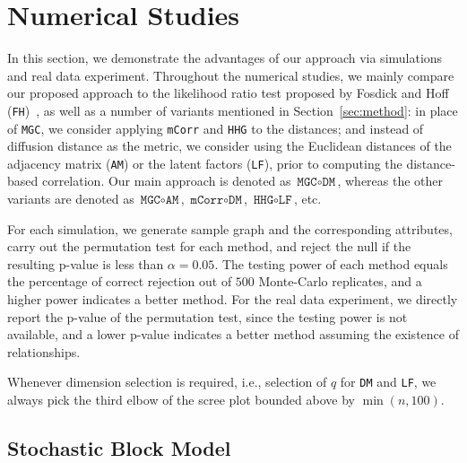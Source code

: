 \documentclass[11pt]{article}
\theoremstyle{definition}
\begin{document}
\section{Numerical Studies}
\label{sec:simulation}

In this section, we demonstrate the advantages of our approach via simulations and real data experiment. Throughout the numerical studies, we mainly compare our proposed approach to the likelihood ratio test proposed by Fosdick and Hoff (\texttt{FH})~\cite{fosdick2015testing}, as well as a number of variants mentioned in Section~\ref{sec:method}: in place of \texttt{MGC}, we consider applying \texttt{mCorr} and \texttt{HHG} to the distances; and instead of diffusion distance as the metric, we consider using the Euclidean distances of the adjacency matrix (\texttt{AM}) or the latent factors (\texttt{LF}), prior to computing the distance-based correlation. Our main approach is denoted as $\texttt{MGC} \circ \texttt{DM}$, whereas the other variants are denoted as $\texttt{MGC} \circ \texttt{AM}$, $\texttt{mCorr} \circ \texttt{DM}$, $\texttt{HHG} \circ \texttt{LF}$, etc. 

For each simulation, we generate sample graph and the corresponding attributes, carry out the permutation test for each method, and reject the null if the resulting p-value is less than $\alpha = 0.05$. The testing power of each method equals the percentage of correct rejection out of $500$ Monte-Carlo replicates, and a higher power indicates a better method. For the real data experiment, we directly report the p-value of the permutation test, since the testing power is not available, and a lower p-value indicates a better method assuming the existence of relationships. 

Whenever dimension selection is required, i.e., selection of $q$ for \texttt{DM} and \texttt{LF}, we always pick the third elbow of the scree plot bounded above by $\min(n, 100)$. 

\subsection{Stochastic Block Model}
\end{document}
